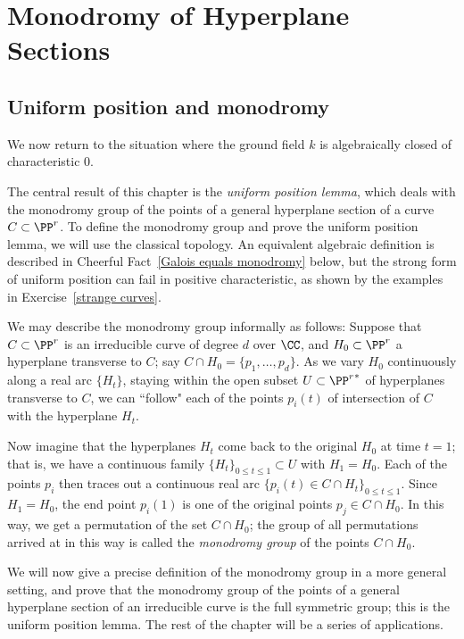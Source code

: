 



\chapter{Monodromy of Hyperplane Sections}\label{uniform position}

\section{Uniform position and monodromy} \label{uniformSection}
We now return to the situation where the ground field $k$ is algebraically closed of characteristic 0.

The central result of this chapter is the  \emph{uniform position lemma}, which deals with the monodromy group of the points of a general hyperplane section of a curve $C \subset \PP^r$. To define the monodromy group  and prove the  uniform position lemma, we will use the classical topology. An equivalent algebraic definition is described in Cheerful Fact~\ref{Galois equals monodromy} below, but the strong form of uniform position can fail in positive characteristic,
as shown by the examples in Exercise~\ref{strange curves}.

We may describe the monodromy group informally as follows: Suppose that $C \subset \PP^r$ is an irreducible curve of degree $d$ over $\CC$, and $H_0 \subset \PP^r$ a hyperplane transverse to $C$; say $C \cap H_0 = \{p_1,\dots,p_d\}$. As we vary $H_0$ continuously along a real arc $\{H_t\}$, staying within the open subset $U \subset {\PP^r}^*$ of hyperplanes transverse to $C$, we can ``follow" each of the points $p_i(t)$ of intersection of $C$ with the hyperplane $H_t$.

Now imagine that the hyperplanes $H_t$ come back to the original $H_0$ at time $t=1$; that is, we have a continuous family $\{H_t\}_{0 \leq t \leq 1} \subset U$ with $H_1 = H_0$. Each of the points $p_i$ then traces out a continuous real arc 
$\{p_i(t) \in C \cap H_t\}_{0 \leq t \leq 1}$. Since $H_1 = H_0$, the end point $p_i(1)$ is one of the original points $p_j \in C \cap H_0$. In this way, we get a permutation of the set $C \cap H_0$; the group of all permutations arrived at in this way is called the \emph{monodromy group} of the points $C \cap H_0$. 

We will now give a precise definition of the monodromy group in a more general setting, and prove that the monodromy group of the points of a general hyperplane section of an irreducible curve
 is the full symmetric group; this is the uniform position lemma. The rest of the chapter will be a series of applications.

